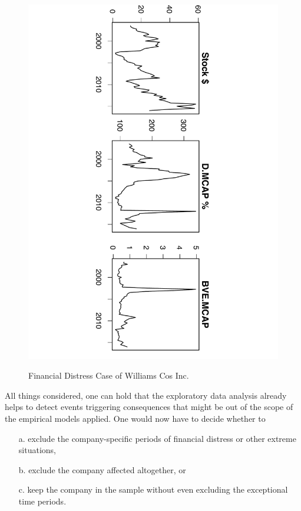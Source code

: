\documentclass[a4paper]{article}
\begin{document}
\begin{figure}[h]
\begin{center}
\vspace{-2cm}
\includegraphics[scale=0.5,angle=90]{C9_Williams_Report.pdf}
\vspace{-2.8cm}
\label{}
\caption{Financial Distress Case of Williams Cos Inc.}
\end{center}
\end{figure}

All things considered, one can hold that the exploratory data analysis already helps to detect events triggering consequences that might be out of the scope of the empirical models applied. One would now have to decide whether to

\begin{itemize}
  \item[a.]  exclude the company-specific periods of financial distress or other extreme situations,
  \item[b.]  exclude the company affected altogether, or
  \item[c.]  keep the company in the sample without even excluding the exceptional time periods.
\end{itemize}
\end{document}
